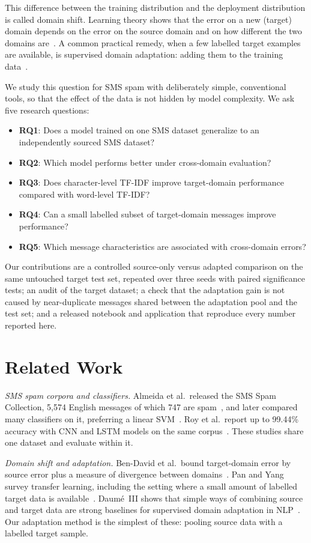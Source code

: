 \documentclass[conference]{IEEEtran}
\begin{document}
This difference between the training distribution and the deployment distribution is called domain shift. Learning theory shows that the error on a new (target) domain depends on the error on the source domain and on how different the two domains are~\cite{bendavid2010}. A common practical remedy, when a few labelled target examples are available, is supervised domain adaptation: adding them to the training data~\cite{daume2007,pan2010}.

We study this question for SMS spam with deliberately simple, conventional tools, so that the effect of the data is not hidden by model complexity. We ask five research questions:
\begin{itemize}
\item \textbf{RQ1}: Does a model trained on one SMS dataset generalize to an independently sourced SMS dataset?
\item \textbf{RQ2}: Which model performs better under cross-domain evaluation?
\item \textbf{RQ3}: Does character-level TF-IDF improve target-domain performance compared with word-level TF-IDF?
\item \textbf{RQ4}: Can a small labelled subset of target-domain messages improve performance?
\item \textbf{RQ5}: Which message characteristics are associated with cross-domain errors?
\end{itemize}

Our contributions are a controlled source-only versus adapted comparison on the same untouched target test set, repeated over three seeds with paired significance tests; an audit of the target dataset; a check that the adaptation gain is not caused by near-duplicate messages shared between the adaptation pool and the test set; and a released notebook and application that reproduce every number reported here.

\section{Related Work}
\textit{SMS spam corpora and classifiers.} Almeida et al.\ released the SMS Spam Collection, 5,574 English messages of which 747 are spam~\cite{almeida2011}, and later compared many classifiers on it, preferring a linear SVM~\cite{almeida2013}. Roy et al.\ report up to 99.44\% accuracy with CNN and LSTM models on the same corpus~\cite{roy2020}. These studies share one dataset and evaluate within it.

\textit{Domain shift and adaptation.} Ben-David et al.\ bound target-domain error by source error plus a measure of divergence between domains~\cite{bendavid2010}. Pan and Yang survey transfer learning, including the setting where a small amount of labelled target data is available~\cite{pan2010}. Daum\'e~III shows that simple ways of combining source and target data are strong baselines for supervised domain adaptation in NLP~\cite{daume2007}. Our adaptation method is the simplest of these: pooling source data with a labelled target sample.
\end{document}
